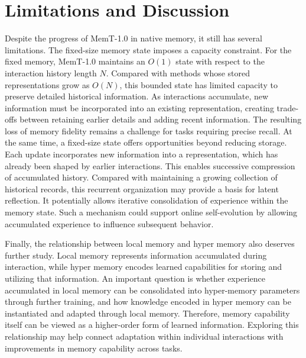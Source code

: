 \section{Limitations and Discussion}
Despite the progress of MemT-1.0 in native memory, it still has several limitations.
The fixed-size memory state imposes a capacity constraint.
For the fixed memory, MemT-1.0 maintains an $O(1)$ state with respect to the interaction history length $N$.
Compared with methods whose stored representations grow as $O(N)$, this bounded state has limited capacity to preserve detailed historical information.
As interactions accumulate, new information must be incorporated into an existing representation, creating trade-offs between retaining earlier details and adding recent information.
The resulting loss of memory fidelity remains a challenge for tasks requiring precise recall.
At the same time, a fixed-size state offers opportunities beyond reducing storage.
Each update incorporates new information into a representation, which has already been shaped by earlier interactions.
This enables successive compression of accumulated history.
Compared with maintaining a growing collection of historical records, this recurrent organization may provide a basis for latent reflection.
It potentially allows iterative consolidation of experience within the memory state.
Such a mechanism could support online self-evolution by allowing accumulated experience to influence subsequent behavior.

Finally, the relationship between local memory and hyper memory also deserves further study.
Local memory represents information accumulated during interaction, while hyper memory encodes learned capabilities for storing and utilizing that information.
An important question is whether experience accumulated in local memory can be consolidated into hyper-memory parameters through further training, and how knowledge encoded in hyper memory can be instantiated and adapted through local memory.
Therefore, memory capability itself can be viewed as a higher-order form of learned information.
Exploring this relationship may help connect adaptation within individual interactions with improvements in memory capability across tasks.
